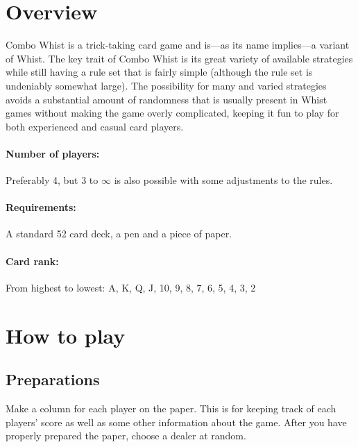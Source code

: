 \documentclass[a4paper]{article}
\author{By Joakim Nilsson}
\date{Development version (based on version \varVersion-\varLanguage)---\today}
\date{Version \varVersion-\varLanguage\---\today}
\begin{document}

	\introPages

	\noindent

	\pagebreak


	\section{Overview}
		Combo Whist is a trick-taking card game and is---as its name implies---a variant of Whist. The key trait of Combo Whist is its great variety of available strategies while still having a rule set that is fairly simple (although the rule set is undeniably somewhat large). The possibility for many and varied strategies avoids a substantial amount of randomness that is usually present in Whist games without making the game overly complicated, keeping it fun to play for both experienced and casual card players.

		\paragraph{Number of players:}
			Preferably 4, but 3 to $\infty$ is also possible with some adjustments to the rules.

		\paragraph{Requirements:}
			A standard 52 card deck, a pen and a piece of paper.

		\paragraph{Card rank:}
			From highest to lowest: A, K, Q, J, 10, 9, 8, 7, 6, 5, 4, 3, 2

	\section{How to play}
		\subsection{Preparations}
			Make a column for each player on the paper. This is for keeping track of each players' score as well as some other information about the game. After you have properly prepared the paper, choose a dealer at random.
\end{document}
